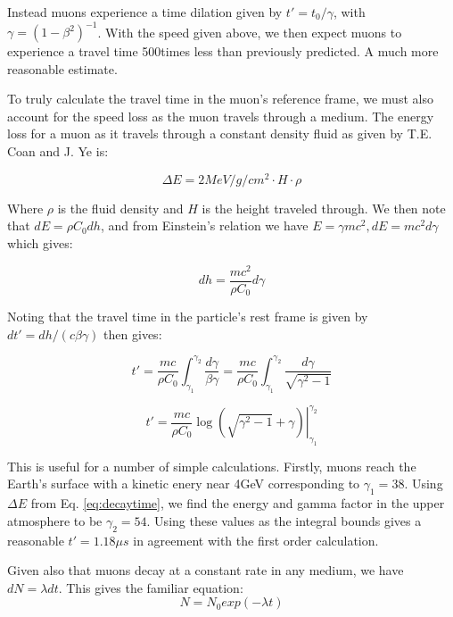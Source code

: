 \documentclass[12pt,twocolumn]{article}
\begin{document}
Instead muons experience a time dilation given by $t'=t_{0}/\gamma$, with $\gamma=\left(1-\beta^{2}\right)^{-1}$.
With the speed given above, we then expect muons to experience a travel time 500times less than previously
predicted. A much more reasonable estimate. 

To truly calculate the travel time in the muon's reference frame, we must also account for the
speed loss as the muon travels through a medium. The energy loss for a muon as it travels
through a constant density fluid as given by T.E. Coan and J. Ye\cite{MUON} is:

\begin{equation}
	\label{eq:decaytime}
	\Delta E = 2 MeV/g/cm^{2} \cdot H \cdot \rho
\end{equation}

Where $\rho$ is the fluid density and $H$ is the height traveled through. We then note that
$dE=\rho C_{0} dh$, and from Einstein's relation we have $E=\gamma mc^{2}, dE=mc^{2}d\gamma$
which gives:

\begin{equation}
	dh = \frac{mc^{2}}{\rho C_{0}} d\gamma
\end{equation}

Noting that the travel time in the particle's rest frame is given by $dt'=dh / \left( c\beta\gamma \right)$
then gives:

\begin{equation}
	t' = \frac{mc}{\rho C_{0}} \int_{\gamma_{1}}^{\gamma_{2}} \frac{ d\gamma }{ \beta\gamma } = \frac{mc}{\rho C_{0}} \int_{\gamma_{1}}^{\gamma_{2}} \frac{ d\gamma }{ \sqrt{ \gamma^{2}-1 } }
\end{equation}


\begin{equation}
	t' = \frac{mc}{\rho C_{0}} \left.\log\left(\sqrt{\gamma^{2}-1}+\gamma\right)\right|_{\gamma_{1}}^{\gamma_{2}}
\end{equation}

This is useful for a number of simple calculations. Firstly, muons reach the Earth's surface with a kinetic enery near 4GeV
 corresponding to $\gamma_{1}=38$. Using $\Delta E$ from Eq. \ref{eq:decaytime}, we find the energy and gamma factor in the
 upper atmosphere to be $\gamma_{2}=54.$ Using these values as the integral bounds gives a reasonable $t'=1.18\mu s$ in agreement with
 the first order calculation.

 Given also that muons decay at a constant rate in any medium, we have $dN=\lambda dt$. This gives the familiar
 equation:
 \begin{equation}
	 \label{eq:probability}
	 N=N_{0}exp(-\lambda t)
 \end{equation}
 
\end{document}
